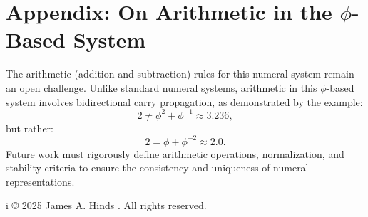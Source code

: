 \documentclass{article}
\begin{document}
\section*{Appendix: On Arithmetic in the $\phi$-Based System}

The arithmetic (addition and subtraction) rules for this numeral system remain an open challenge. Unlike standard numeral systems, arithmetic in this $\phi$-based system involves bidirectional carry propagation, as demonstrated by the example:
\[
2 \neq \phi^2 + \phi^{-1} \approx 3.236,
\]
but rather:
\[
2 = \phi + \phi^{-2} \approx 2.0.
\]
Future work must rigorously define arithmetic operations, normalization, and stability criteria to ensure the consistency and uniqueness of numeral representations.

i\vfill
\smallskip
\noindent\small © 2025 James A. Hinds . All rights reserved.
\end{document}
